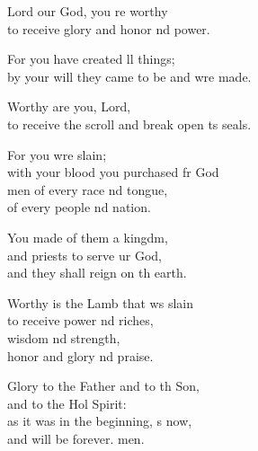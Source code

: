 \settowidth{\versewidth}{to receive the scroll and break open its seals.}
\begin{psalmverse}%
  \begin{patverse}
 Lord our God, you re worthy\Med\\
to receive glory and honor nd power.

For you have created ll things;\Med\\
by your will they came to be and wre made.

Worthy are you,  Lord,\Med\\
to receive the scroll and break open \pointup{\i}ts seals.

For you wre slain;\Med\\
with your blood you purchased fr God\\
men of every race nd tongue,\Med\\
of every people nd nation.

You made of them a kingdm,\Flex\\
and priests to serve ur God,\Med\\
and they shall reign on th earth.

Worthy is the Lamb that ws slain\Med\\
to receive power nd riches,\Med\\
wisdom nd strength,\\
honor and glory nd praise.

Glory to the Father and to th Son,\Med\\
and to the Hol Spirit:\\
as it was in the beginning, \pointup{\i}s now,\Med\\
and will be forever. men.
  \end{patverse}
\end{psalmverse}
